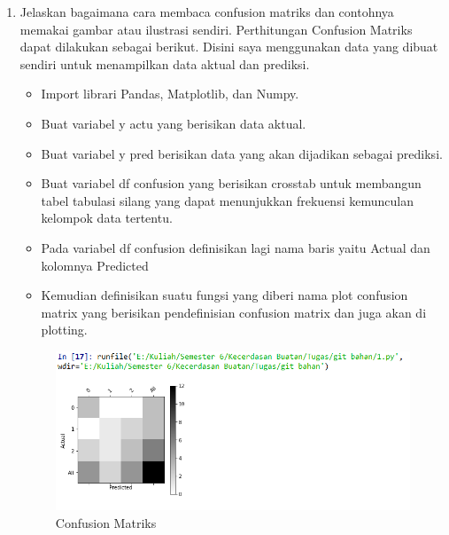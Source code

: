 \begin{enumerate}
\item Jelaskan bagaimana cara membaca confusion matriks dan contohnya memakai gambar atau ilustrasi sendiri.
Perthitungan Confusion Matriks dapat dilakukan sebagai berikut. Disini saya menggunakan data yang dibuat sendiri untuk menampilkan data aktual dan prediksi.
\begin{itemize}
\item
Import librari Pandas, Matplotlib, dan Numpy.
\item
Buat variabel y actu yang berisikan data aktual.
\item
Buat variabel y pred berisikan data yang akan dijadikan sebagai prediksi.
\item
Buat variabel df confusion yang berisikan crosstab untuk membangun tabel tabulasi silang yang dapat menunjukkan frekuensi kemunculan kelompok data tertentu.
\item
Pada variabel df confusion definisikan lagi nama baris yaitu Actual dan kolomnya Predicted
\item
Kemudian definisikan suatu fungsi yang diberi nama plot confusion matrix yang berisikan pendefinisian confusion matrix dan juga akan di plotting.

\end{itemize}
\begin{figure}[ht]
\centering
\includegraphics[scale=0.5]{figures/1174003/3/1.PNG}
\caption{Confusion Matriks}
\label{contoh}
\end{figure}


\end{enumerate}
